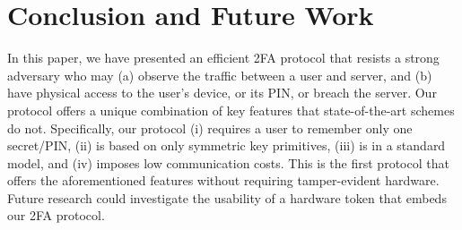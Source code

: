 

\section{Conclusion and Future Work}
\vspace{-1mm}
In this paper, we have presented an efficient 2FA protocol that resists a strong adversary who may (a) observe the traffic between a user and server, and (b) have physical access to the user’s device, or its PIN, or breach the server. Our protocol offers a unique combination of key features that state-of-the-art schemes do not. Specifically,  our protocol (i) requires a user to remember only one secret/PIN, (ii) is based on only symmetric key primitives, (iii) is in a standard model, and (iv) imposes low communication costs. This is the first protocol that offers the aforementioned features without requiring tamper-evident hardware. Future research could investigate the usability of a hardware token that embeds our 2FA protocol. 

